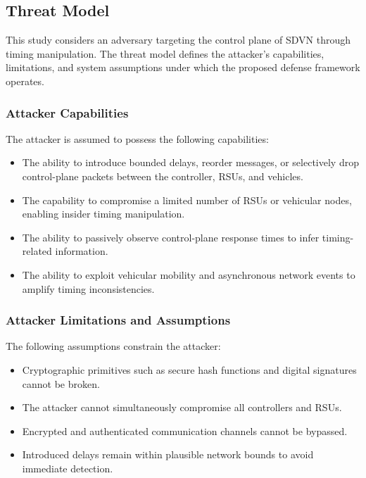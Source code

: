 \subsection{Threat Model}

This study considers an adversary targeting the control plane of SDVN through timing manipulation. The threat model defines the attacker’s capabilities, limitations, and system assumptions under which the proposed defense framework operates.

\subsubsection{Attacker Capabilities}

The attacker is assumed to possess the following capabilities:
\begin{itemize}
    \item The ability to introduce bounded delays, reorder messages, or selectively drop control-plane packets between the controller, RSUs, and vehicles.
    \item The capability to compromise a limited number of RSUs or vehicular nodes, enabling insider timing manipulation.
    \item The ability to passively observe control-plane response times to infer timing-related information.
    \item The ability to exploit vehicular mobility and asynchronous network events to amplify timing inconsistencies.
\end{itemize}

\subsubsection{Attacker Limitations and Assumptions}

The following assumptions constrain the attacker:
\begin{itemize}
    \item Cryptographic primitives such as secure hash functions and digital signatures cannot be broken.
    \item The attacker cannot simultaneously compromise all controllers and RSUs.
    \item Encrypted and authenticated communication channels cannot be bypassed.
    \item Introduced delays remain within plausible network bounds to avoid immediate detection.
\end{itemize}


